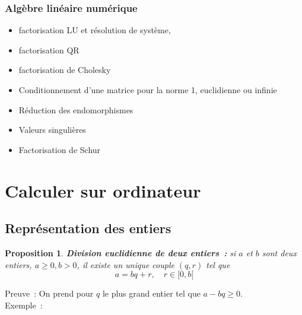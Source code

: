 \documentclass[a4paper,11pt]{article}
\newtheorem{prop}[thm]{Proposition}
\begin{document}
\begin{giacjshere}
\subsubsection{Alg\`ebre lin\'eaire num\'erique}
\begin{itemize}
\item factorisation LU et r\'esolution de syst\`eme,
\item factorisation QR
\item factorisation de Cholesky
\item Conditionnement d'une matrice pour la norme 1, euclidienne ou infinie
\item R\'eduction des endomorphismes
\item Valeurs singuli\`eres
\item Factorisation de Schur
\end{itemize}

\section{Calculer sur ordinateur} \label{sec:calculer}

\subsection{Représentation des entiers}

\begin{prop}
{\bf Division euclidienne de deux entiers~:} si $a$ et $b$ sont
deux entiers, $a \geq 0, b>0$, il existe un unique couple $(q,r)$ tel que
\[ a = bq +r , \quad r \in [0, b[ \]
\end{prop}
Preuve~: On prend pour $q$ le plus grand entier tel que $a-bq \geq 0$.\\
Exemple~: 


\end{giacjshere}
\end{document}
